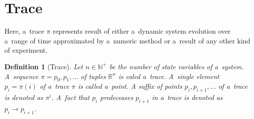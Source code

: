 \documentclass[12pt,oneside,draft]{fithesis}
\newcommand{\mReal}{\mathbb{R}}
\newcommand{\mNatural}{\mathbb{N}}
\newtheorem{mydef}{Definition}
\begin{document}
\section{Trace}
Here, a~trace $\pi$ represents result of either a~dynamic system
evolution over a~range of time\cite{sven}\cite{pospisil} approximated by
a~numeric method or a~result of any other kind of experiment.
\begin{mydef}[Trace]
Let $n\in\mNatural^+$ be the number of state variables of a~system.
A~sequence $\pi=p_0,p_1,\dotsc$ of tuples %
$\mReal^n$
is caled a~trace. A~single element $p_i=\pi(i)$ of a~trace $\pi$ is
called a~point.
A suffix of points $p_i,p_{i+1},\dotsc$ of a~trace is
denoted as $\pi^i$.
A~fact that $p_i$ predeceases $p_{i+1}$ in a~trace is denoted as
$p_i\rightarrow p_{i+1}$.
\end{mydef}


\end{document}

